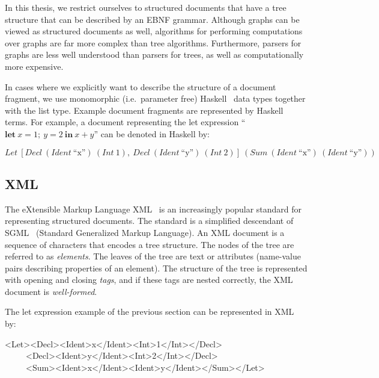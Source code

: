In this thesis, we restrict ourselves to structured documents that have a tree structure that can be described by an EBNF grammar. Although graphs can be viewed as structured documents as well, algorithms for performing computations over graphs are far more complex than tree algorithms. Furthermore, parsers for graphs are less well understood than parsers for trees, as well as computationally more expensive. 

In cases where we explicitly want to describe the structure of a document fragment, we use monomorphic (i.e.\ parameter free) Haskell~\cite{peytonJones03haskell} data types together with the list type. Example document fragments are represented by Haskell terms. For example, a document representing the let expression  ``$\mathbf{let}~x = 1;~y = 2~\mathbf{in}~x+y$'' can be denoted in Haskell by: 

\begin{small}
$Let~[Decl~(Ident~\text{``x''})~(Int~1),~Decl~(Ident~\text{``y''})~(Int~2)]~(Sum~(Ident~\text{``x''})~(Ident~\text{``y''}))$
\end{small}

\subsection{XML}

The eXtensible Markup Language XML~\cite{xml11} is an increasingly popular standard for representing structured documents. The standard is a simplified descendant of SGML~\cite{sgml86} (Standard Generalized Markup Language). An XML document is a sequence of characters that encodes a tree structure. The nodes of the tree are referred to as {\em elements}. The leaves of the tree are text or attributes (name-value pairs describing properties of an element). The structure of the tree  is represented with opening and closing {\em tags}, and if these tags are nested correctly, the XML document is {\em well-formed}.

The let expression example of the previous section can be represented in XML by:

\ttfamily\begin{small}\begin{tabbing}
<Let><Decl><Ident>x</Ident><Int>1</Int></Decl>\\
~~~~~<Decl><Ident>y</Ident><Int>2</Int></Decl>\\
~~~~~<Sum><Ident>x</Ident><Ident>y</Ident></Sum></Let>
\end{tabbing}\end{small}\rmfamily

